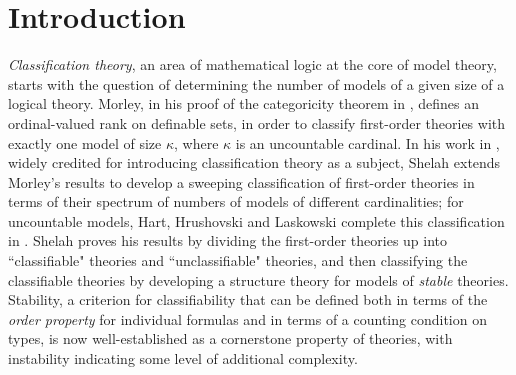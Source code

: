 \documentclass{amsart}
\theoremstyle{definition}
\theoremstyle{remark}
\numberwithin{equation}{section}
\begin{document}
\begin{abstract}
While Malliaris implicitly showed that the properties $\mathrm{NSOP}_{n}$ are equivalent to closure under helix-shaped covering maps or \textit{helix maps} between graphs, both our observation that the properties $\mathrm{NSOP}_{n}$ can be restated so that $n$ can be replaced with any real number at least 3, and our result that $\mathfrak{o}(\mathcal{H})$ is an integer when $\mathcal{H}$ is a hereditary class defined by a finite family of forbidden weakly embedded substructures, are even exhibited by a special class of helix maps, the \textit{interval helix maps}. These are helix maps that respect the direction of edges, and whose regions are disjoint unions of linearly ordered sets without any edges between them. Toward showing the conjectural claim that $\mathfrak{o}(\mathcal{H})$ is not an integer in general, and therefore that the real-valued $\mathrm{NSOP}_{r}$ hierarchy is distinct from the integer-valued $\mathrm{NSOP}_{n}$ hierarchy at the level of hereditary classes, we show that the statement that $\mathfrak{o}(\mathcal{H})$ is an integer in general cannot be exhibited by interval helix maps.




  
\end{abstract}

\maketitle


\section{Introduction}


\textit{Classification theory}, an area of mathematical logic at the core of model theory, starts with the question of determining the number of models of a given size of a logical theory. Morley, in his proof of the categoricity theorem in \cite{M65}, defines an ordinal-valued rank on definable sets, in order to classify first-order theories with exactly one model of size $\kappa$, where $\kappa$ is an uncountable cardinal. In his work in \cite{Sh90}, widely credited for introducing classification theory as a subject, Shelah extends Morley's results to develop a sweeping classification of first-order theories in terms of their spectrum of numbers of models of different cardinalities; for uncountable models, Hart, Hrushovski and Laskowski complete this classification in \cite{HHL00}. Shelah proves his results by dividing the first-order theories up into ``classifiable" theories and ``unclassifiable" theories, and then classifying the classifiable theories by developing a structure theory for models of \textit{stable} theories. Stability, a criterion for classifiability that can be defined both in terms of the \textit{order property} for individual formulas and in terms of a counting condition on types, is now well-established as a cornerstone property of theories, with instability indicating some level of additional complexity.
\end{document}
